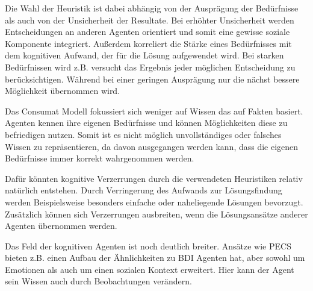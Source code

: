Die Wahl der Heuristik ist dabei abhängig von der Ausprägung der Bedürfnisse als auch von der Unsicherheit der Resultate.
Bei erhöhter Unsicherheit werden Entscheidungen an anderen Agenten orientiert und somit eine gewisse soziale Komponente integriert.
Außerdem korreliert die Stärke eines Bedürfnisses mit dem kognitiven Aufwand, der für die Lösung aufgewendet wird.
Bei starken Bedürfnissen wird z.B. versucht das Ergebnis jeder möglichen Entscheidung zu berücksichtigen.
Während bei einer geringen Ausprägung nur die nächst bessere Möglichkeit übernommen wird.

Das Consumat Modell fokussiert sich weniger auf Wissen das auf Fakten basiert.
Agenten kennen ihre eigenen Bedürfnisse und können Möglichkeiten diese zu befriedigen nutzen\cite[Kapitel 4]{janssen2001fashions}.
Somit ist es nicht möglich unvollständiges oder falsches Wissen zu repräsentieren, da davon ausgegangen werden kann, dass die eigenen Bedürfnisse immer korrekt wahrgenommen werden.

Dafür könnten kognitive Verzerrungen durch die verwendeten Heuristiken relativ natürlich entstehen.
Durch Verringerung des Aufwands zur Lösungsfindung werden Beispielsweise besonders einfache oder naheliegende Lösungen bevorzugt.
Zusätzlich können sich Verzerrungen ausbreiten, wenn die Lösungsansätze anderer Agenten übernommen werden.

Das Feld der kognitiven Agenten ist noch deutlich breiter.
Ansätze wie PECS\cite{urban1999pecs} bieten z.B. einen Aufbau der Ähnlichkeiten zu BDI Agenten hat, aber sowohl um Emotionen als auch um einen sozialen Kontext erweitert.
Hier kann der Agent sein Wissen auch durch Beobachtungen verändern.

